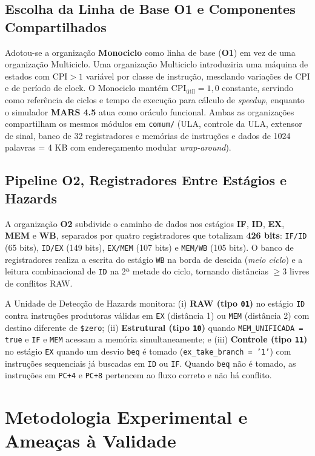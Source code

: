 \documentclass[12pt]{article}
\begin{document}
\subsection{Escolha da Linha de Base O1 e Componentes Compartilhados}
Adotou-se a organização \textbf{Monociclo} como linha de base (\textbf{O1}) em vez de uma organização Multiciclo. Uma organização Multiciclo introduziria uma máquina de estados com $\text{CPI} > 1$ variável por classe de instrução, mesclando variações de CPI e de período de clock. O Monociclo mantém $\text{CPI}_{\text{útil}} = 1{,}0$ constante, servindo como referência de ciclos e tempo de execução para cálculo de \textit{speedup}, enquanto o simulador \textbf{MARS 4.5} atua como oráculo funcional. Ambas as organizações compartilham os mesmos módulos em \texttt{comum/} (ULA, controle da ULA, extensor de sinal, banco de 32 registradores e memórias de instruções e dados de 1024 palavras = 4 KB com endereçamento modular \textit{wrap-around}).

\subsection{Pipeline O2, Registradores Entre Estágios e Hazards}
A organização \textbf{O2} subdivide o caminho de dados nos estágios \textbf{IF}, \textbf{ID}, \textbf{EX}, \textbf{MEM} e \textbf{WB}, separados por quatro registradores que totalizam \textbf{426 bits}: \texttt{IF/ID} (65 bits), \texttt{ID/EX} (149 bits), \texttt{EX/MEM} (107 bits) e \texttt{MEM/WB} (105 bits). O banco de registradores realiza a escrita do estágio \texttt{WB} na borda de descida (\textit{meio ciclo}) e a leitura combinacional de \texttt{ID} na 2ª metade do ciclo, tornando distâncias $\ge 3$ livres de conflitos RAW.

A Unidade de Detecção de Hazards monitora: (i) \textbf{RAW (tipo \texttt{01})} no estágio \texttt{ID} contra instruções produtoras válidas em \texttt{EX} (distância 1) ou \texttt{MEM} (distância 2) com destino diferente de \texttt{\$zero}; (ii) \textbf{Estrutural (tipo \texttt{10})} quando \texttt{MEM\_UNIFICADA = true} e \texttt{IF} e \texttt{MEM} acessam a memória simultaneamente; e (iii) \textbf{Controle (tipo \texttt{11})} no estágio \texttt{EX} quando um desvio \texttt{beq} é tomado (\texttt{ex\_take\_branch = '1'}) com instruções sequenciais já buscadas em \texttt{ID} ou \texttt{IF}. Quando \texttt{beq} não é tomado, as instruções em \texttt{PC+4} e \texttt{PC+8} pertencem ao fluxo correto e não há conflito.

\section{Metodologia Experimental e Ameaças à Validade}
\end{document}
